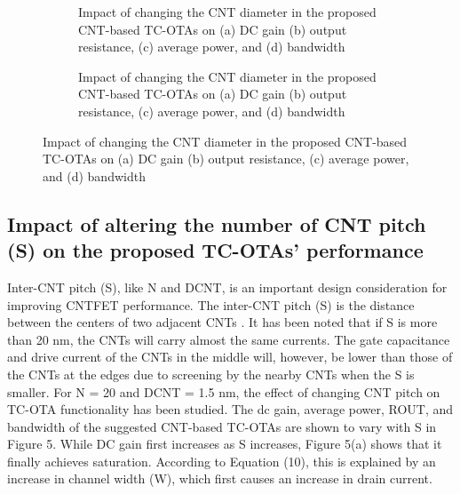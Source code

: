 \begin{figure}[htbp]
  \centering
  \begin{subfigure}[b]{0.48\linewidth}
    \centering
    \caption{Impact of changing the CNT diameter in the proposed CNT-based TC-OTAs on (a) DC gain (b) output resistance, (c) average power, and (d) bandwidth}

  \end{subfigure}
  \hfill
  \begin{subfigure}[b]{0.48\linewidth}
    \centering
    \caption{Impact of changing the CNT diameter in the proposed CNT-based TC-OTAs on (a) DC gain (b) output resistance, (c) average power, and (d) bandwidth}

  \end{subfigure}
  \caption{Impact of changing the CNT diameter in the proposed CNT-based TC-OTAs on (a) DC gain (b) output resistance, (c) average power, and (d) bandwidth}

  \label{fig:group_6dccg}
\end{figure}

\subsection*{Impact of altering the number of CNT pitch (S) on the proposed TC-OTAs' performance}

Inter-CNT pitch (S), like N and DCNT, is an important design consideration for
improving CNTFET performance. The inter-CNT pitch (S) is the distance between
the centers of two adjacent CNTs \cite{ref11,ref12}. It has been noted that if S
is more than 20 nm, the CNTs will carry almost the same currents. The gate
capacitance and drive current of the CNTs in the middle will, however, be lower
than those of the CNTs at the edges due to screening by the nearby CNTs when the
S is smaller. For N = 20 and DCNT = 1.5 nm, the effect of changing CNT pitch on
TC-OTA functionality has been studied. The dc gain, average power, ROUT, and
bandwidth of the suggested CNT-based TC-OTAs are shown to vary with S in Figure
5. While DC gain first increases as S increases, Figure 5(a) shows that it
finally achieves saturation. According to Equation (10), this is explained by an
increase in channel width (W), which first causes an increase in drain current.


